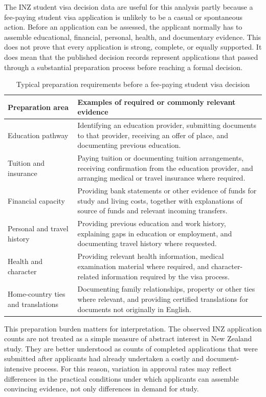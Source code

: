 \documentclass[runningheads]{llncs}
\begin{document}
The INZ student visa decision data are useful for this analysis partly because a fee-paying student visa application is unlikely to be a casual or spontaneous action. Before an application can be assessed, the applicant normally has to assemble educational, financial, personal, health, and documentary evidence. This does not prove that every application is strong, complete, or equally supported. It does mean that the published decision records represent applications that passed through a substantial preparation process before reaching a formal decision.

\begin{table}
\caption{Typical preparation requirements before a fee-paying student visa decision}
\label{tab:appendix-student-visa-preparation}
\centering
\renewcommand{\arraystretch}{1.2}
\setlength{\tabcolsep}{6pt}
\begin{tabular}{p{}p{}}
\hline
Preparation area & Examples of required or commonly relevant evidence \\
\hline
Education pathway & Identifying an education provider, submitting documents to that provider, receiving an offer of place, and documenting previous education. \\
Tuition and insurance & Paying tuition or documenting tuition arrangements, receiving confirmation from the education provider, and arranging medical or travel insurance where required. \\
Financial capacity & Providing bank statements or other evidence of funds for study and living costs, together with explanations of source of funds and relevant incoming transfers. \\
Personal and travel history & Providing previous education and work history, explaining gaps in education or employment, and documenting travel history where requested. \\
Health and character & Providing relevant health information, medical examination material where required, and character-related information required by the visa process. \\
Home-country ties and translations & Documenting family relationships, property or other ties where relevant, and providing certified translations for documents not originally in English. \\
\hline
\end{tabular}
\end{table}

This preparation burden matters for interpretation. The observed INZ application counts are not treated as a simple measure of abstract interest in New Zealand study. They are better understood as counts of completed applications that were submitted after applicants had already undertaken a costly and document-intensive process. For this reason, variation in approval rates may reflect differences in the practical conditions under which applicants can assemble convincing evidence, not only differences in demand for study.
\end{document}
